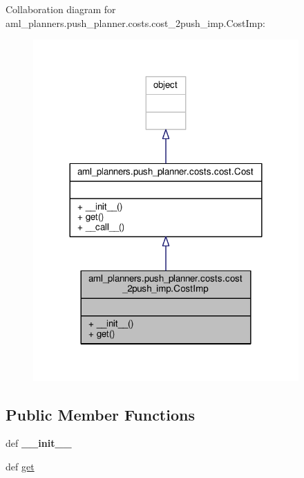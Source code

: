 Collaboration diagram for aml\-\_\-planners.\-push\-\_\-planner.\-costs.\-cost\-\_\-2push\-\_\-imp.\-Cost\-Imp\-:\nopagebreak
\begin{figure}[H]
\begin{center}
\leavevmode
\includegraphics[width=288pt]{classaml__planners_1_1push__planner_1_1costs_1_1cost__2push__imp_1_1_cost_imp__coll__graph}
\end{center}
\end{figure}
\subsection*{Public Member Functions}
\begin{DoxyCompactItemize}
\item 
\hypertarget{classaml__planners_1_1push__planner_1_1costs_1_1cost__2push__imp_1_1_cost_imp_a5a6e792e8d9ad57d18300269a91a6ef1}{def {\bfseries \-\_\-\-\_\-init\-\_\-\-\_\-}}\label{classaml__planners_1_1push__planner_1_1costs_1_1cost__2push__imp_1_1_cost_imp_a5a6e792e8d9ad57d18300269a91a6ef1}

\item 
def \hyperlink{classaml__planners_1_1push__planner_1_1costs_1_1cost__2push__imp_1_1_cost_imp_ad1708070936f803e3bc690711dcf232f}{get}
\end{DoxyCompactItemize}


